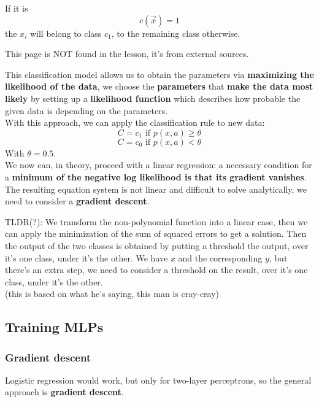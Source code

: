 If it is
$$ c(\vec{x}) = 1 $$
the $x_i$ will belong to class $c_1$, to the remaining class otherwise.\\

\vfill

This page is NOT found in the lesson, it's from external sources.

\newpage

This classification model allows us to obtain the parameters via \textbf{maximizing the likelihood of the data}, we choose the \textbf{parameters} that \textbf{make the data most likely} by setting up a \textbf{likelihood function} which describes how probable the given data is depending on the parameters.\\

With this approach, we can apply the classification rule to new data: 
$$ C = c_1 \text{ if } p(x, a) \geq \theta $$
$$ C = c_0 \text{ if } p(x, a) < \theta $$
With $\theta = 0.5$.\\

We now can, in theory, proceed with a linear regression: a necessary condition for a \textbf{minimum of the negative log likelihood is that its gradient vanishes}.\\

The resulting equation system is not linear and difficult to solve analytically, we need to consider a \textbf{gradient descent}.\\

\vfill 

TLDR(?): We transform the non-polynomial function into a linear case, then we can apply the minimization of the sum of squared errors to get a solution. Then the output of the two classes is obtained by putting a threshold the output, over it's one class, under it's the other. We have $x$ and the corresponding $y$, but there's an extra step, we need to consider a threshold on the result, over it's one class, under it's the other.\\

(this is based on what he's saying, this man is cray-cray)


\newpage

\subsection{Training MLPs}
\subsubsection{Gradient descent}
Logistic regression would work, but only for two-layer perceptrons, so the general approach is \textbf{gradient descent}.\\

